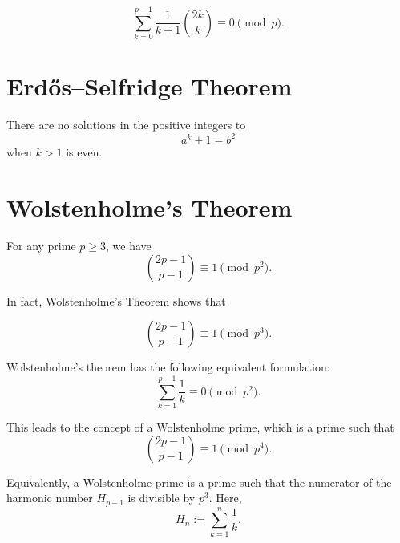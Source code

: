 \begin{theorem}
  \begin{equation*}
    \sum_{k=0}^{p-1}\frac{1}{k+1}\binom{2k}{k}\equiv 0\pmod{p}.
  \end{equation*}
\end{theorem}

\section{Erd\H{o}s--Selfridge Theorem}

There are no solutions in the positive integers to
\begin{equation*}
  a^k+1=b^2
\end{equation*}
when $k>1$ is even.

\section{Wolstenholme's Theorem}

\begin{theorem}
  For any prime $p\geq 3$, we have
  \begin{equation*}
    \binom{2p-1}{p-1}\equiv 1\pmod{p^2}.
  \end{equation*}
\end{theorem}

In fact, Wolstenholme's Theorem shows that
\begin{theorem}
  \begin{equation*}
    \binom{2p-1}{p-1}\equiv 1\pmod{p^3}.
  \end{equation*}
\end{theorem}

Wolstenholme's theorem has the following equivalent formulation:
\begin{equation*}
  \sum_{k=1}^{p-1}\frac{1}{k}\equiv 0\pmod{p^2}.
\end{equation*}

This leads to the concept of a Wolstenholme prime, which is a prime such that
\begin{equation*}
  \binom{2p-1}{p-1}\equiv 1\pmod{p^4}.
\end{equation*}

Equivalently, a Wolstenholme prime is a prime such that the numerator of the harmonic number $H_{p-1}$ is divisible by $p^3$. Here,
\begin{equation*}
  H_n:=\sum_{k=1}^n\frac{1}{k}.
\end{equation*}

